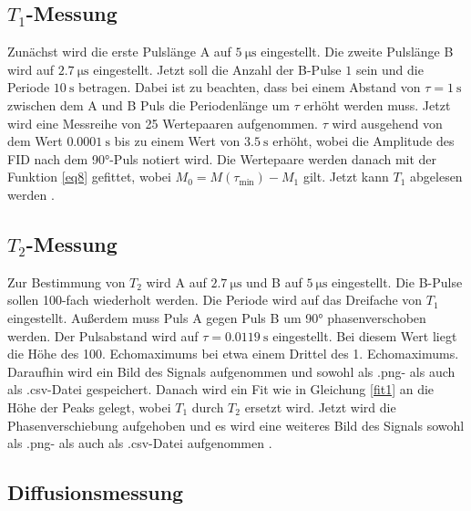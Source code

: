 \subsection{\texorpdfstring{$T_1$}{T1}-Messung}
\label{sec:T1Messung}

Zunächst wird die erste Pulslänge A auf $\SI{5}{\micro\second}$ eingestellt.
Die zweite Pulslänge B wird auf $\SI{2.7}{\micro\second}$ eingestellt.
Jetzt soll die Anzahl der B-Pulse $1$ sein und die Periode $\SI{10}{\second}$
betragen. Dabei ist zu beachten, dass bei einem Abstand von $\tau = \SI{1}{\second}$
zwischen dem A und B Puls die Periodenlänge um $\tau$ erhöht werden muss.
Jetzt wird eine Messreihe von 25 Wertepaaren aufgenommen. 
$\tau$ wird ausgehend von dem Wert $\SI{0.0001}{\second}$ bis zu einem Wert von 
$\SI{3.5}{\second}$ erhöht, wobei die Amplitude des FID nach dem 90°-Puls
notiert wird.
Die Wertepaare werden danach mit der Funktion \eqref{eq8}
gefittet, wobei %
$M_{\text{0}} = M(\tau_{\text{min}}) - M_{\text{1}}$ gilt.
Jetzt kann $T_{\text{1}}$ abgelesen werden
\cite{anleitung}. 

\subsection{\texorpdfstring{$T_2$}{T2}-Messung}
\label{sec:T2Messung}

Zur Bestimmung von $T_{\text{2}}$ wird A auf $\SI{2.7}{\micro\second}$ und B auf
$\SI{5}{\micro\second}$ eingestellt. Die B-Pulse sollen 100-fach wiederholt werden.
Die Periode wird auf das Dreifache von $T_{\text{1}}$ eingestellt.
Außerdem muss Puls A gegen Puls B um 90° phasenverschoben werden. Der Pulsabstand wird 
auf $\tau = \SI{0.0119}{\second}$ eingestellt. Bei diesem Wert liegt die Höhe 
des 100. Echomaximums bei etwa einem Drittel des 1. Echomaximums.
Daraufhin wird ein Bild des Signals aufgenommen und sowohl als .png- als auch als 
.csv-Datei gespeichert. Danach wird ein Fit wie in Gleichung \ref{fit1} 
an die Höhe der Peaks gelegt,
wobei $T_{\text{1}}$ durch $T_{\text{2}}$ ersetzt wird.
Jetzt wird die Phasenverschiebung aufgehoben und es wird eine weiteres Bild des 
Signals sowohl als .png- als auch als .csv-Datei aufgenommen \cite{anleitung}.

\subsection{Diffusionsmessung}
\label{Diffusionsmessung}

